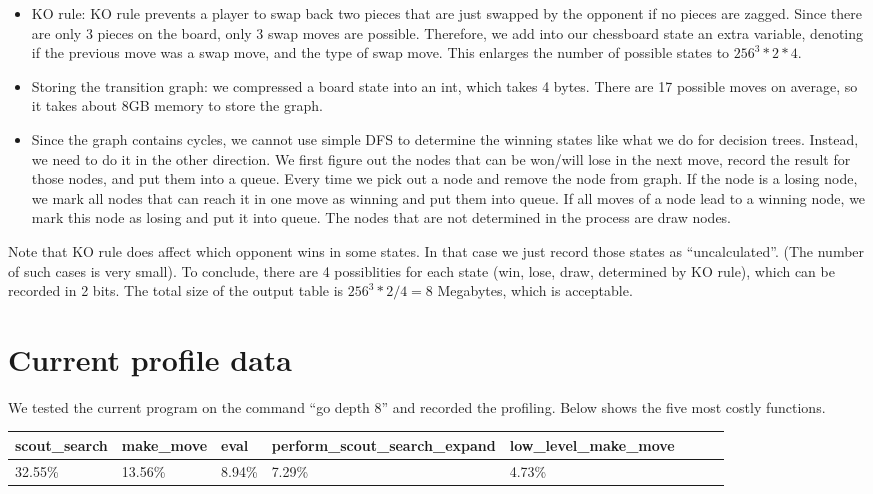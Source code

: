 \documentclass[10pt,twosidep]{article}
\begin{document}
	\begin{itemize}
	\item KO rule: KO rule prevents a player to swap back two pieces that are just swapped by the opponent 
	if no pieces are zagged. Since there are only 3 pieces on the board, only 3 swap moves are possible. 
	Therefore, we add into our chessboard state an extra variable, denoting if the previous move was a swap move, 
	and the type of swap move. This enlarges the number of possible states to $256^3*2*4$.
	\item Storing the transition graph: we compressed a board state into an int, which takes 4 bytes. 
	There are 17 possible moves on average, so it takes about 8GB memory to store the graph. 
	\item Since the graph contains cycles, 
	we cannot use simple DFS to determine the winning states like what we do for decision trees. Instead, 
	we need to do it in the other direction. 
	We first figure out the nodes that can be won/will lose in the next move, 
	record the result for those nodes, and put them into a queue. 
	Every time we pick out a node and remove the node from graph. 
	If the node is a losing node, we mark all nodes that can reach it in one move as winning and put them into queue. 
	If all moves of a node lead to a winning node, we mark this node as losing and put it into queue. 
	The nodes that are not determined in the process are draw nodes. 
	\end{itemize}
	Note that KO rule does affect which opponent wins in some states. In that case 
	we just record those states as ``uncalculated''. (The number of such cases is very small).
	To conclude, there are 4 possiblities for each state (win, lose, draw, determined by KO rule), 
	which can be recorded in 2 bits. The total size of the output table
	is $256^3*2/4=8$ Megabytes, which is acceptable.

\section{Current profile data}
We tested the current program on the command ``go depth 8'' and recorded the profiling. Below shows the five most costly functions.

\begin{tabular}{ |l|l|l|l|l|l|l|l| }
\hline
scout\_search & make\_move & eval & perform\_scout\_search\_expand & low\_level\_make\_move\\
\hline
32.55\% & 13.56\% & 8.94\% & 7.29\% & 4.73\%\\
\hline
\end{tabular}
\end{document}
